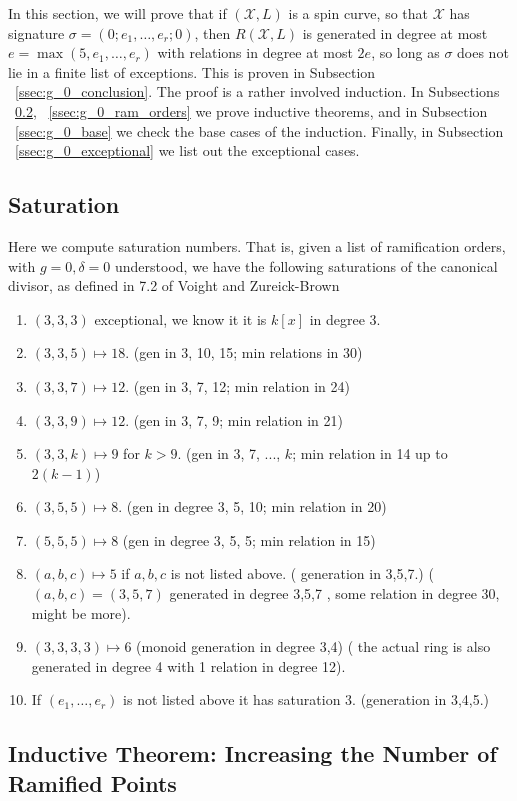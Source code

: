 \documentclass{amsart}
\theoremstyle{plain}
\theoremstyle{definition}
\theoremstyle{remark}
\numberwithin{equation}{section}
\newcommand\ssec{\subsection}
\newcommand \sx{\mathscr X}
\newcommand \halfcan{L}
\begin{document}
In this section, we will prove that if $(\sx,\halfcan)$ is a spin
curve, so that $\sx$ has signature $\sigma = (0; e_1, \ldots, e_r;0)
$, then $R(\sx,\halfcan)$ is generated in degree at most $e =
\max(5, e_1, \ldots, e_r)$ with relations in degree at most $2e$, so
long as $\sigma$ does not lie in a finite list of exceptions. This
is proven in Subsection ~\ref{ssec:g_0_conclusion}. The proof is a
rather involved induction. In Subsections ~\ref{ssec:g_0_ram_pts},
~\ref{ssec:g_0_ram_orders} we prove inductive theorems, and in
Subsection ~\ref{ssec:g_0_base} we check the base cases of the
induction. Finally, in Subsection ~\ref{ssec:g_0_exceptional} we
list out the exceptional cases.


\ssec{Saturation}
\label{ssec:g_0_saturation}

Here we compute saturation numbers. That is, given a list of
ramification orders, with $g = 0,\delta = 0$ understood, we have
the following saturations of the canonical divisor, as defined in
7.2 of Voight and Zureick-Brown \cite{vzb:stacky}
\begin{enumerate}
	\item $(3,3,3)$ exceptional, we know it it is $k[x]$ in degree 3.
	\item $(3,3,5) \mapsto 18.$ (gen in 3, 10, 15; min relations in 30)
	\item $(3,3,7) \mapsto 12.$ (gen in 3, 7, 12; min relation in 24) 
	\item $(3,3,9) \mapsto 12.$ (gen in 3, 7, 9; min relation in 21)
	\item $(3,3,k) \mapsto 9$ for $k > 9$. (gen in 3, 7, ..., $k$; 
min relation in 14 up to $2(k-1)$)
	\item $(3,5,5) \mapsto 8.$ (gen in degree 3, 5, 10; min relation 
in 20)
	\item $(5,5,5)\mapsto 8$ (gen in degree 3, 5, 5; min relation in 
15)
	\item $(a,b,c)\mapsto 5$ if $a,b,c$ is not listed above. (
generation in 3,5,7.) ($(a,b,c) = (3,5,7)$ generated in degree 3,5,7
, some relation in degree 30, might be more).
	\item $(3,3,3,3) \mapsto 6$ (monoid generation in degree 3,4) (
the actual ring is also generated in degree 4 with 1 relation in 
degree 12).
	\item If $(e_1,\ldots, e_r)$ is not listed above it has 
saturation $3$. (generation in 3,4,5.)
\end{enumerate}

\ssec{Inductive Theorem: Increasing the Number of Ramified Points}
\label{ssec:g_0_ram_pts}
\end{document}
